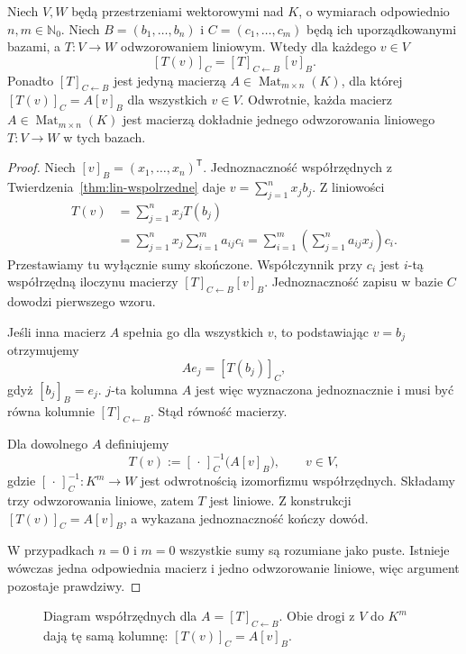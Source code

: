 \begin{twierdzenie}
\label{thm:lin4-wspolrzedne-macierz}
Niech \(V,W\) będą przestrzeniami wektorowymi
nad \(K\), o wymiarach odpowiednio
\(n,m\in\mathbb N_0\). Niech
\(B=(b_1,\ldots,b_n)\) i \(C=(c_1,\ldots,c_m)\)
będą ich uporządkowanymi bazami,
a \(T\colon V\to W\) odwzorowaniem liniowym.
Wtedy dla każdego \(v\in V\)
\[
 [T(v)]_C=[T]_{C\leftarrow B}\,[v]_B.
\]
Ponadto \([T]_{C\leftarrow B}\) jest jedyną
macierzą \(A\in\operatorname{Mat}_{m\times n}(K)\),
dla której \([T(v)]_C=A[v]_B\)
dla wszystkich \(v\in V\).
Odwrotnie, każda macierz
\(A\in\operatorname{Mat}_{m\times n}(K)\)
jest macierzą dokładnie jednego odwzorowania
liniowego \(T\colon V\to W\) w tych bazach.
\end{twierdzenie}
\begin{proof}
Niech \([v]_B=(x_1,\ldots,x_n)^{\mathsf T}\).
Jednoznaczność współrzędnych z
Twierdzenia~\ref{thm:lin-wspolrzedne}
daje \(v=\sum_{j=1}^{n}x_jb_j\).
Z liniowości
\[
 \begin{aligned}
 T(v)&=\sum_{j=1}^{n}x_jT(b_j)\\
 &=\sum_{j=1}^{n}x_j
     \sum_{i=1}^{m}a_{ij}c_i
 =\sum_{i=1}^{m}
    \left(\sum_{j=1}^{n}a_{ij}x_j\right)c_i.
 \end{aligned}
\]
Przestawiamy tu wyłącznie sumy skończone.
Współczynnik przy \(c_i\) jest
\(i\)-tą współrzędną iloczynu macierzy
\([T]_{C\leftarrow B}[v]_B\).
Jednoznaczność zapisu w bazie \(C\)
dowodzi pierwszego wzoru.

Jeśli inna macierz \(A\) spełnia go
dla wszystkich \(v\), to podstawiając
\(v=b_j\) otrzymujemy
\[
 A e_j=[T(b_j)]_C,
\]
gdyż \([b_j]_B=e_j\).
\(j\)-ta kolumna \(A\) jest więc wyznaczona
jednoznacznie i musi być równa kolumnie
\([T]_{C\leftarrow B}\). Stąd równość macierzy.

Dla dowolnego \(A\) definiujemy
\[
 T(v):=[\,\cdot\,]_C^{-1}
         \bigl(A[v]_B\bigr),
 \qquad v\in V,
\]
gdzie \([\,\cdot\,]_C^{-1}\colon K^m\to W\)
jest odwrotnością izomorfizmu współrzędnych.
Składamy trzy odwzorowania liniowe,
zatem \(T\) jest liniowe.
Z konstrukcji \([T(v)]_C=A[v]_B\),
a wykazana jednoznaczność kończy dowód.

W przypadkach \(n=0\) i \(m=0\)
wszystkie sumy są rozumiane jako puste.
Istnieje wówczas jedna odpowiednia macierz
i jedno odwzorowanie liniowe, więc
argument pozostaje prawdziwy.
\end{proof}

\begin{figure}[!htbp]
\centering
{}
\caption{Diagram współrzędnych dla
\(A=[T]_{C\leftarrow B}\).
Obie drogi z \(V\) do \(K^m\) dają tę samą kolumnę:
\([T(v)]_C=A[v]_B\).}
\label{fig:lin4-wspolrzedne}
\end{figure}

